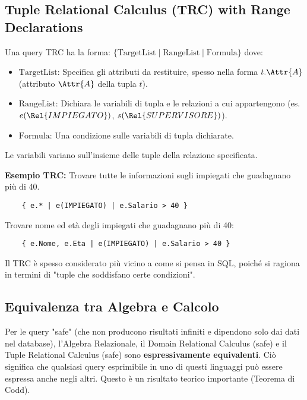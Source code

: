 \subsection{Tuple Relational Calculus (TRC) with Range Declarations}
Una query TRC ha la forma:
$\{ \text{TargetList} \mid \text{RangeList} \mid \text{Formula} \}$
dove:
\begin{itemize}
	\item $\text{TargetList}$: Specifica gli attributi da restituire, spesso nella forma $t.\Attr{A}$ (attributo $\Attr{A}$ della tupla $t$).
	\item $\text{RangeList}$: Dichiara le variabili di tupla e le relazioni a cui appartengono (es. $e(\Rel{IMPIEGATO})$, $s(\Rel{SUPERVISORE})$).
	\item $\text{Formula}$: Una condizione sulle variabili di tupla dichiarate.
\end{itemize}
Le variabili variano sull'insieme delle tuple della relazione specificata.

\textbf{Esempio TRC:} Trovare tutte le informazioni sugli impiegati che guadagnano più di 40.
\begin{verbatim}
	{ e.* | e(IMPIEGATO) | e.Salario > 40 }
\end{verbatim}
Trovare nome ed età degli impiegati che guadagnano più di 40:
\begin{verbatim}
	{ e.Nome, e.Eta | e(IMPIEGATO) | e.Salario > 40 }
\end{verbatim}
Il TRC è spesso considerato più vicino a come si pensa in SQL, poiché si ragiona in termini di "tuple che soddisfano certe condizioni".

\subsection{Equivalenza tra Algebra e Calcolo}
Per le query "safe" (che non producono risultati infiniti e dipendono solo dai dati nel database), l'Algebra Relazionale, il Domain Relational Calculus (safe) e il Tuple Relational Calculus (safe) sono \textbf{espressivamente equivalenti}. Ciò significa che qualsiasi query esprimibile in uno di questi linguaggi può essere espressa anche negli altri. Questo è un risultato teorico importante (Teorema di Codd).

